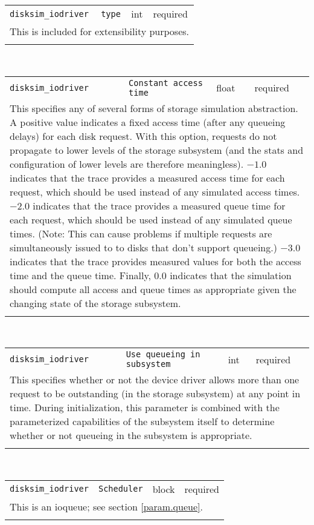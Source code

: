 \noindent 
\begin{tabular}{|p{1.5in}|p{3.5in}|p{0.5in}|p{0.5in}|}
\cline{1-4}
\texttt{disksim\_iodriver} & \texttt{type} & int & required \\ 
\cline{1-4}
\multicolumn{4}{|p{6in}|}{
This is included for extensibility purposes.
}\\ 
\cline{1-4}
\multicolumn{4}{p{5in}}{}\\
\end{tabular}\\ 
\noindent 
\begin{tabular}{|p{1.5in}|p{3.5in}|p{0.5in}|p{0.5in}|}
\cline{1-4}
\texttt{disksim\_iodriver} & \texttt{Constant access time} & float & required \\ 
\cline{1-4}
\multicolumn{4}{|p{6in}|}{
This specifies any of several forms of storage simulation abstraction.
A positive value indicates a fixed access time (after any queueing
delays) for each disk request. With this option, requests do not
propagate to lower levels of the storage subsystem (and the stats and
configuration of lower levels are therefore meaningless). $-1.0$
indicates that the trace provides a measured access time for each
request, which should be used instead of any simulated access times.
$-2.0$ indicates that the trace provides a measured queue time for
each request, which should be used instead of any simulated queue
times. (Note: This can cause problems if multiple requests are
simultaneously issued to to disks that don't support queueing.)
$-3.0$ indicates that the trace provides measured values for both the
access time and the queue time. Finally, $0.0$ indicates that the
simulation should compute all access and queue times as appropriate
given the changing state of the storage subsystem.
}\\ 
\cline{1-4}
\multicolumn{4}{p{5in}}{}\\
\end{tabular}\\ 
\noindent 
\begin{tabular}{|p{1.5in}|p{3.5in}|p{0.5in}|p{0.5in}|}
\cline{1-4}
\texttt{disksim\_iodriver} & \texttt{Use queueing in subsystem} & int & required \\ 
\cline{1-4}
\multicolumn{4}{|p{6in}|}{
This specifies whether or not the device driver allows more than one
request to be outstanding (in the storage subsystem) at any point in
time. During initialization, this parameter is combined with the
parameterized capabilities of the subsystem itself to determine
whether or not queueing in the subsystem is appropriate.
}\\ 
\cline{1-4}
\multicolumn{4}{p{5in}}{}\\
\end{tabular}\\ 
\noindent 
\begin{tabular}{|p{1.5in}|p{3.5in}|p{0.5in}|p{0.5in}|}
\cline{1-4}
\texttt{disksim\_iodriver} & \texttt{Scheduler} & block & required \\ 
\cline{1-4}
\multicolumn{4}{|p{6in}|}{
This is an ioqueue; see section \ref{param.queue}.
}\\ 
\cline{1-4}
\multicolumn{4}{p{5in}}{}\\
\end{tabular}\\ 
